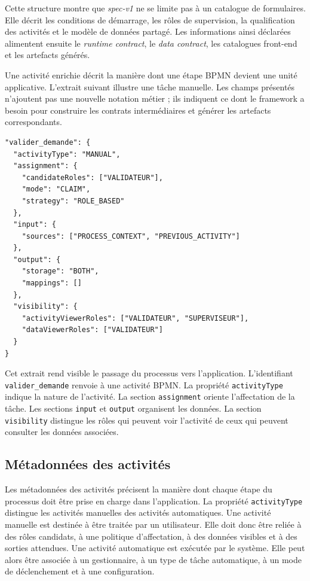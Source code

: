 Cette structure montre que \textit{spec-v1} ne se limite pas à un catalogue de formulaires. Elle décrit les conditions de démarrage, les rôles de supervision, la qualification des activités et le modèle de données partagé. Les informations ainsi déclarées alimentent ensuite le \textit{runtime contract}, le \textit{data contract}, les catalogues front-end et les artefacts générés.

Une activité enrichie décrit la manière dont une étape BPMN devient une unité applicative. L'extrait suivant illustre une tâche manuelle. Les champs présentés n'ajoutent pas une nouvelle notation métier ; ils indiquent ce dont le framework a besoin pour construire les contrats intermédiaires et générer les artefacts correspondants.

\begin{lstlisting}[caption={Extrait schématique d'une activité enrichie},label={lst:chap3-activite-enrichie}]
"valider_demande": {
  "activityType": "MANUAL",
  "assignment": {
    "candidateRoles": ["VALIDATEUR"],
    "mode": "CLAIM",
    "strategy": "ROLE_BASED"
  },
  "input": {
    "sources": ["PROCESS_CONTEXT", "PREVIOUS_ACTIVITY"]
  },
  "output": {
    "storage": "BOTH",
    "mappings": []
  },
  "visibility": {
    "activityViewerRoles": ["VALIDATEUR", "SUPERVISEUR"],
    "dataViewerRoles": ["VALIDATEUR"]
  }
}
\end{lstlisting}

Cet extrait rend visible le passage du processus vers l'application. L'identifiant \texttt{valider\_demande} renvoie à une activité BPMN. La propriété \texttt{activityType} indique la nature de l'activité. La section \texttt{assignment} oriente l'affectation de la tâche. Les sections \texttt{input} et \texttt{output} organisent les données. La section \texttt{visibility} distingue les rôles qui peuvent voir l'activité de ceux qui peuvent consulter les données associées.

\subsection{Métadonnées des activités}

Les métadonnées des activités précisent la manière dont chaque étape du processus doit être prise en charge dans l'application. La propriété \texttt{activityType} distingue les activités manuelles des activités automatiques. Une activité manuelle est destinée à être traitée par un utilisateur. Elle doit donc être reliée à des rôles candidats, à une politique d'affectation, à des données visibles et à des sorties attendues. Une activité automatique est exécutée par le système. Elle peut alors être associée à un gestionnaire, à un type de tâche automatique, à un mode de déclenchement et à une configuration.

